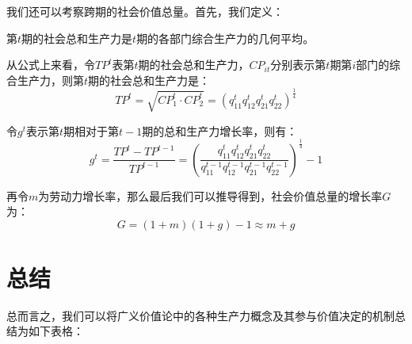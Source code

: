 我们还可以考察跨期的社会价值总量。首先，我们定义：
\begin{definition}
    第$t$期的社会总和生产力是$t$期的各部门综合生产力的几何平均\cite[291]{CaiJiMingCongGuDianZhengZhiJingJiXueDaoZhongGuoTeSeSheHuiZhuYiZhengZhiJingJiXueJiYuZhongGuoShiJiaoDeZhengZhiJingJiXueYanBianShangCe2023}。
\end{definition}

从公式上来看，令$\mathit{TP}^t$表第$t$期的社会总和生产力，$CP_{it}$分别表示第$t$期第$i$部门的综合生产力，则第$t$期的社会总和生产力是\cite[291]{CaiJiMingCongGuDianZhengZhiJingJiXueDaoZhongGuoTeSeSheHuiZhuYiZhengZhiJingJiXueJiYuZhongGuoShiJiaoDeZhengZhiJingJiXueYanBianShangCe2023}：
\begin{equation}
    \mathit{TP}^t = \sqrt{\mathit{CP}_1^t \cdot \mathit{CP}_2^t} = \left( q_{11}^t q_{12}^t q_{21}^t q_{22}^t \right)^\frac{1}{4}
\end{equation}

令$g^t$表示第$t$期相对于第$t-1$期的总和生产力增长率，则有\cite[291]{CaiJiMingCongGuDianZhengZhiJingJiXueDaoZhongGuoTeSeSheHuiZhuYiZhengZhiJingJiXueJiYuZhongGuoShiJiaoDeZhengZhiJingJiXueYanBianShangCe2023}：
\begin{equation}
    g^t = \frac{\mathit{TP}^t - \mathit{TP}^{t-1}}{\mathit{TP}^{t-1}} = \left( \frac{q_{11}^t q_{12}^t q_{21}^t q_{22}^t}{q_{11}^{t-1} q_{12}^{t-1} q_{21}^{t-1} q_{22}^{t-1}} \right)^\frac{1}{4} - 1
\end{equation}

再令$m$为劳动力增长率，那么最后我们可以推导得到，社会价值总量的增长率$G$为：
\begin{equation}
    G = \left( 1+m \right) \left( 1+g \right) - 1 \approx m + g
\end{equation}

\section{总结}

总而言之，我们可以将广义价值论中的各种生产力概念及其参与价值决定的机制总结为如下表格：

